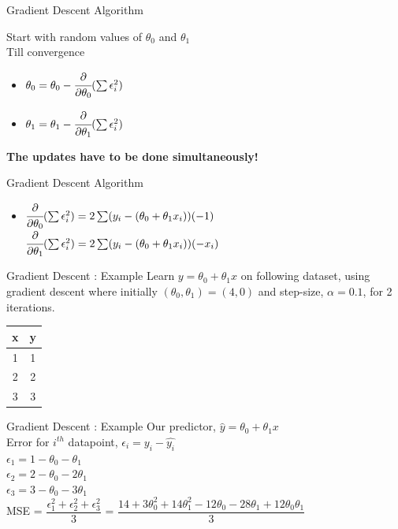 \documentclass{beamer}
\begin{document}
\begin{frame}{Gradient Descent Algorithm}

Start with random values of $\theta_{0}$ and $\theta_{1}$\\
Till convergence
\begin{itemize}
\item $\theta_{0} = \theta_{0} - \cfrac{\partial}{\partial \theta_{0}} (\sum \epsilon_{i}^{2}) $
\item $\theta_{1} = \theta_{1} - \cfrac{\partial}{\partial \theta_{1}} (\sum \epsilon_{i}^{2}) $
\end{itemize}

\textbf{The updates have to be done simultaneously!}
\end{frame}

\begin{frame}{Gradient Descent Algorithm}

\begin{itemize}
\item $\cfrac{\partial}{\partial \theta_{0}} (\sum \epsilon_{i}^{2}) = 2\sum (y_{i} - (\theta_{0} + \theta_{1}x_{i}))(-1)$
$\cfrac{\partial}{\partial \theta_{1}} (\sum \epsilon_{i}^{2}) = 2\sum (y_{i} - (\theta_{0} + \theta_{1}x_{i}))(-x_{i})$
\end{itemize}
\end{frame}

	\begin{frame}{Gradient Descent : Example}
Learn $y = \theta_0 + \theta_1 x$ on following dataset, using gradient descent where initially $(\theta_0, \theta_1) = (4,0)$ and step-size, $\alpha  = 0.1$, for 2 iterations. 
\begin{table}[]
	\centering
	\label{tab:my-table}
	\begin{tabular}{|c|c|}
		\hline
		\textbf{x} & \textbf{y} \\ \hline
		1 & 1 \\ \hline
		2 & 2 \\ \hline
		3 & 3 \\ \hline
	\end{tabular}
\end{table}
\end{frame}



\begin{frame}{Gradient Descent : Example}
Our predictor, $\hat{y} = \theta_0 + \theta_1x$\\
\vspace{1cm}
Error for $i^{th}$ datapoint, $\epsilon_i = y_i - \hat{y_i}$\\
$\epsilon_1 = 1 - \theta_0 - \theta_1$ \\
$\epsilon_2 = 2 - \theta_0 - 2\theta_1$ \\
$\epsilon_3 = 3 - \theta_0 - 3\theta_1$ \\

\vspace{1cm}
MSE = $\dfrac{\epsilon_1^2 + \epsilon_2^2 + \epsilon_3^2}{3}$ = $\dfrac{14 + 3\theta_0^2 + 14\theta_1^2 -12\theta_0 - 28\theta_1 + 12\theta_0\theta_1}{3}$\\
\end{frame}
\end{document}

